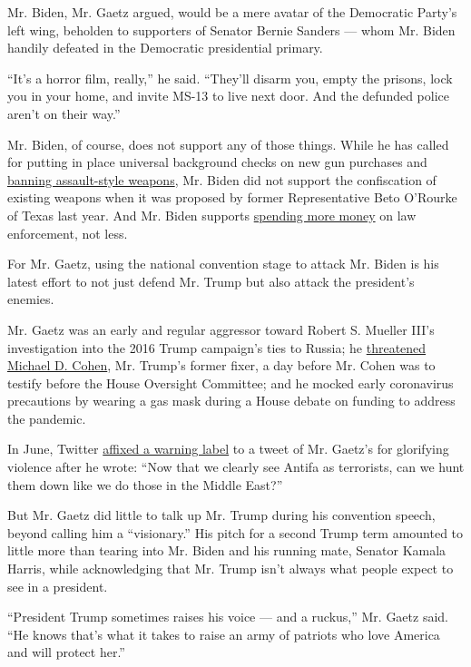 Mr. Biden, Mr. Gaetz argued, would be a mere avatar of the Democratic
Party's left wing, beholden to supporters of Senator Bernie Sanders ---
whom Mr. Biden handily defeated in the Democratic presidential primary.

``It's a horror film, really,'' he said. ``They'll disarm you, empty the
prisons, lock you in your home, and invite MS-13 to live next door. And
the defunded police aren't on their way.''

Mr. Biden, of course, does not support any of those things. While he has
called for putting in place universal background checks on new gun
purchases and
\href{https://www.nytimes3xbfgragh.onion/2019/08/11/opinion/joe-biden-ban-assault-weapons.html}{banning
assault-style weapons}, Mr. Biden did not support the confiscation of
existing weapons when it was proposed by former Representative Beto
O'Rourke of Texas last year. And Mr. Biden supports
\href{https://www.nytimes3xbfgragh.onion/2020/08/19/us/politics/democrats-biden-defund-police.html}{spending
more money} on law enforcement, not less.

For Mr. Gaetz, using the national convention stage to attack Mr. Biden
is his latest effort to not just defend Mr. Trump but also attack the
president's enemies.

Mr. Gaetz was an early and regular aggressor toward Robert S. Mueller
III's investigation into the 2016 Trump campaign's ties to Russia; he
\href{https://www.nytimes3xbfgragh.onion/2019/06/28/us/politics/matt-gaetz-ethics.html}{threatened
Michael D. Cohen}, Mr. Trump's former fixer, a day before Mr. Cohen was
to testify before the House Oversight Committee; and he mocked early
coronavirus precautions by wearing a gas mask during a House debate on
funding to address the pandemic.

In June, Twitter
\href{https://www.nytimes3xbfgragh.onion/2020/06/01/technology/twitter-matt-gaetz-warning.html}{affixed
a warning label} to a tweet of Mr. Gaetz's for glorifying violence after
he wrote: ``Now that we clearly see Antifa as terrorists, can we hunt
them down like we do those in the Middle East?''

But Mr. Gaetz did little to talk up Mr. Trump during his convention
speech, beyond calling him a ``visionary.'' His pitch for a second Trump
term amounted to little more than tearing into Mr. Biden and his running
mate, Senator Kamala Harris, while acknowledging that Mr. Trump isn't
always what people expect to see in a president.

``President Trump sometimes raises his voice --- and a ruckus,'' Mr.
Gaetz said. ``He knows that's what it takes to raise an army of patriots
who love America and will protect her.''

